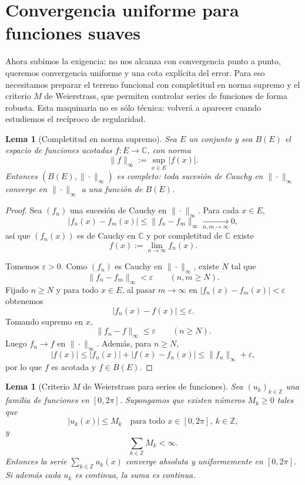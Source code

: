 \documentclass[a4paper,11pt]{report}
\newtheorem{lemma}[theorem]{Lema}
\begin{document}
\section{Convergencia uniforme para funciones suaves}

Ahora subimos la exigencia: no nos alcanza con convergencia punto a punto, queremos convergencia uniforme y una cota expl\'icita del error. Para eso necesitamos preparar el terreno funcional con completitud en norma supremo y el criterio $M$ de Weierstrass, que permiten controlar series de funciones de forma robusta. Esta maquinaria no es s\'olo t\'ecnica: volver\'a a aparecer cuando estudiemos el rec\'iproco de regularidad.

\begin{lemma}[Completitud en norma supremo]\label{lem:completitud_supremo}
Sea $E$ un conjunto y sea $B(E)$ el espacio de funciones acotadas $f:E\to\mathbb C$, con norma
\[
\|f\|_\infty:=\sup_{x\in E}|f(x)|.
\]
Entonces $(B(E),\|\cdot\|_\infty)$ es completo: toda sucesión de Cauchy en $\|\cdot\|_\infty$ converge en $\|\cdot\|_\infty$ a una función de $B(E)$.
\end{lemma}

\begin{proof}
Sea $(f_n)$ una sucesión de Cauchy en $\|\cdot\|_\infty$. Para cada $x\in E$,
\[
|f_n(x)-f_m(x)|\le \|f_n-f_m\|_\infty\xrightarrow[n,m\to\infty]{}0,
\]
así que $(f_n(x))$ es de Cauchy en $\mathbb C$ y por completitud de $\mathbb C$ existe
\[
f(x):=\lim_{n\to\infty}f_n(x).
\]

Tomemos $\varepsilon>0$. Como $(f_n)$ es Cauchy en $\|\cdot\|_\infty$, existe $N$ tal que
\[
\|f_n-f_m\|_\infty<\varepsilon\qquad(n,m\ge N).
\]
Fijado $n\ge N$ y para todo $x\in E$, al pasar $m\to\infty$ en
$|f_n(x)-f_m(x)|<\varepsilon$ obtenemos
\[
|f_n(x)-f(x)|\le \varepsilon.
\]
Tomando supremo en $x$,
\[
\|f_n-f\|_\infty\le \varepsilon\qquad(n\ge N).
\]
Luego $f_n\to f$ en $\|\cdot\|_\infty$. Además, para $n\ge N$,
\[
|f(x)|\le |f_n(x)|+|f(x)-f_n(x)|\le \|f_n\|_\infty+\varepsilon,
\]
por lo que $f$ es acotada y $f\in B(E)$.
\end{proof}

\begin{lemma}[Criterio $M$ de Weierstrass para series de funciones]\label{lem:criterio_M_weierstrass}
Sea $(u_k)_{k\in\mathbb Z}$ una familia de funciones en $[0,2\pi]$. Supongamos que existen números $M_k\ge 0$ tales que
\[
|u_k(x)|\le M_k\quad\text{para todo }x\in[0,2\pi],\ k\in\mathbb Z,
\]
y
\[
\sum_{k\in\mathbb Z} M_k<\infty.
\]
Entonces la serie $\sum_{k\in\mathbb Z}u_k(x)$ converge absoluta y uniformemente en $[0,2\pi]$. Si además cada $u_k$ es continua, la suma es continua.
\end{lemma}
\end{document}
